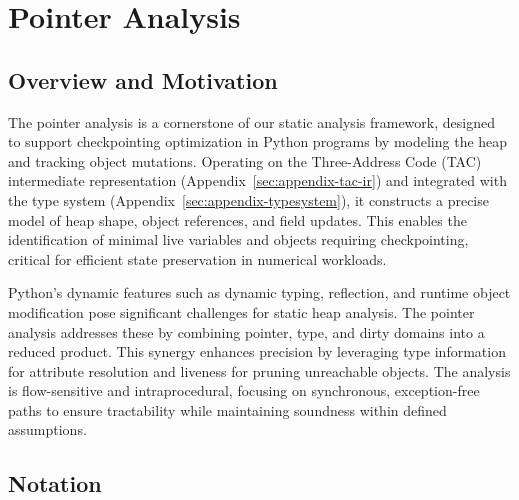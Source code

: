 \section{Pointer Analysis}
\label{sec:appendix-pointer}

\subsection{Overview and Motivation}

The pointer analysis is a cornerstone of our static analysis framework, designed to support checkpointing optimization in Python programs by modeling the heap and tracking object mutations. Operating on the Three-Address Code (TAC) intermediate representation (Appendix~\ref{sec:appendix-tac-ir}) and integrated with the type system (Appendix~\ref{sec:appendix-typesystem}), it constructs a precise model of heap shape, object references, and field updates. This enables the identification of minimal live variables and objects requiring checkpointing, critical for efficient state preservation in numerical workloads.

Python’s dynamic features such as dynamic typing, reflection, and runtime object modification pose significant challenges for static heap analysis. The pointer analysis addresses these by combining pointer, type, and dirty domains into a reduced product. This synergy enhances precision by leveraging type information for attribute resolution and liveness for pruning unreachable objects. The analysis is flow-sensitive and intraprocedural, focusing on synchronous, exception-free paths to ensure tractability while maintaining soundness within defined assumptions.

\subsection{Notation}


